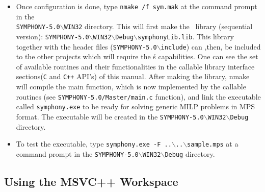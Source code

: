 \begin{itemize}
\item Once configuration is done, type \texttt{nmake /f sym.mak} at the
command prompt in the \\
\texttt{SYMPHONY-5.0$\backslash$WIN32} directory. 
This will first make the \BB\ library (sequential version): 
\texttt{SYMPHONY-5.0$\backslash$WIN32$\backslash$Debug$\backslash$symphonyLib.lib}. This library together with the header files 
(\texttt{SYMPHONY-5.0$\backslash$include}) can ,then, be
included to the other projects which will require the \BB\'s capabilities. 
One can see the set of available routines and their functionalities in 
the callable library interface sections(\texttt{C} and \texttt{C++} API's) 
of this manual. After making the library, nmake will compile the main 
function, which is now implemented by the callable routines (see 
\texttt{SYMPHONY-5.0/Master/main.c} function), and link the executable 
called \texttt{symphony.exe} to be ready for solving generic MILP problems 
in MPS format. The executable will be created in the
\texttt{SYMPHONY-5.0$\backslash$WIN32$\backslash$Debug} directory.

\item To test the executable, type \texttt{symphony.exe -F 
..$\backslash$..$\backslash$sample.mps} at a command prompt in the
\texttt{SYMPHONY-5.0$\backslash$WIN32$\backslash$Debug} directory.

\end{itemize}

\subsection{Using the MSVC++ Workspace}

